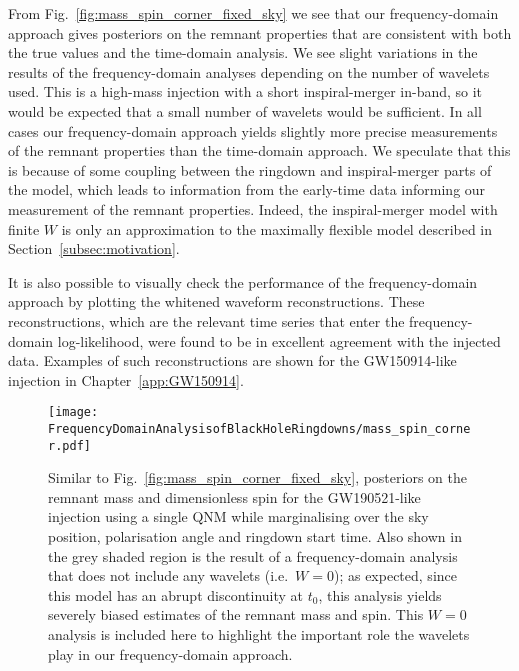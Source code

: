 From Fig.~\ref{fig:mass_spin_corner_fixed_sky} we see that our frequency-domain approach gives posteriors on the remnant properties that are consistent with both the true values and the time-domain analysis.
We see slight variations in the results of the frequency-domain analyses depending on the number of wavelets used.
This is a high-mass injection with a short inspiral-merger in-band, so it would be expected that a small number of wavelets would be sufficient.
In all cases our frequency-domain approach yields slightly more precise measurements of the remnant properties than the time-domain approach.
We speculate that this is because of some coupling between the ringdown and inspiral-merger parts of the model, which leads to information from the early-time data informing our measurement of the remnant properties.
Indeed, the inspiral-merger model with finite $W$ is only an approximation to the maximally flexible model described in Section~\ref{subsec:motivation}.

It is also possible to visually check the performance of the frequency-domain approach by plotting the whitened waveform reconstructions.
These reconstructions, which are the relevant time series that enter the frequency-domain log-likelihood, were found to be in excellent agreement with the injected data. 
Examples of such reconstructions are shown for the GW150914-like injection in Chapter~\ref{app:GW150914}.

\begin{figure}
    \centering
    \texttt{[image: FrequencyDomainAnalysisofBlackHoleRingdowns/mass\_spin\_corner.pdf]}
    \caption[Posteriors on the remnant mass and spin for a GW190521-like injection analysed while marginalising over the sky position, polarisation angle and ringdown start time]{ 
    Similar to Fig.~\ref{fig:mass_spin_corner_fixed_sky}, posteriors on the remnant mass and dimensionless spin for the GW190521-like injection using a single QNM while marginalising over the sky position, polarisation angle and ringdown start time.
    Also shown in the grey shaded region is the result of a frequency-domain analysis that does not include any wavelets (i.e.\ $W=0$); as expected, since this model has an abrupt discontinuity at $t_0$, this analysis yields severely biased estimates of the remnant mass and spin. 
    This $W=0$ analysis is included here to highlight the important role the wavelets play in our frequency-domain approach.
    }
    \label{fig:mass_spin_corner_zero_spin}
\end{figure}

